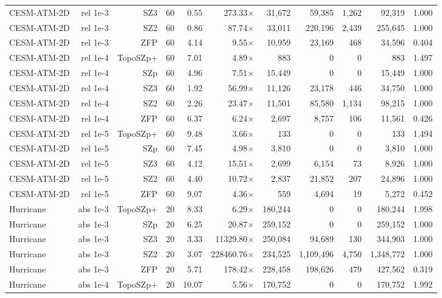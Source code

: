 \begin{tabular}{lrrrrrrrrrr}
CESM-ATM-2D & rel 1e-3 & SZ3 & 60 & 0.55 & 273.33$\times$ & 31,672 & 59,385 & 1,262 & 92,319 & 1.000 \\
CESM-ATM-2D & rel 1e-3 & SZ2 & 60 & 0.86 & 87.74$\times$ & 33,011 & 220,196 & 2,439 & 255,645 & 1.000 \\
CESM-ATM-2D & rel 1e-3 & ZFP & 60 & 4.14 & 9.55$\times$ & 10,959 & 23,169 & 468 & 34,596 & 0.404 \\
CESM-ATM-2D & rel 1e-4 & TopoSZp+ & 60 & 7.01 & 4.89$\times$ & 883 & 0 & 0 & 883 & 1.497 \\
CESM-ATM-2D & rel 1e-4 & SZp & 60 & 4.96 & 7.51$\times$ & 15,449 & 0 & 0 & 15,449 & 1.000 \\
CESM-ATM-2D & rel 1e-4 & SZ3 & 60 & 1.92 & 56.99$\times$ & 11,126 & 23,178 & 446 & 34,750 & 1.000 \\
CESM-ATM-2D & rel 1e-4 & SZ2 & 60 & 2.26 & 23.47$\times$ & 11,501 & 85,580 & 1,134 & 98,215 & 1.000 \\
CESM-ATM-2D & rel 1e-4 & ZFP & 60 & 6.37 & 6.24$\times$ & 2,697 & 8,757 & 106 & 11,561 & 0.426 \\
CESM-ATM-2D & rel 1e-5 & TopoSZp+ & 60 & 9.48 & 3.66$\times$ & 133 & 0 & 0 & 133 & 1.494 \\
CESM-ATM-2D & rel 1e-5 & SZp & 60 & 7.45 & 4.98$\times$ & 3,810 & 0 & 0 & 3,810 & 1.000 \\
CESM-ATM-2D & rel 1e-5 & SZ3 & 60 & 4.12 & 15.51$\times$ & 2,699 & 6,154 & 73 & 8,926 & 1.000 \\
CESM-ATM-2D & rel 1e-5 & SZ2 & 60 & 4.40 & 10.72$\times$ & 2,837 & 21,852 & 207 & 24,896 & 1.000 \\
CESM-ATM-2D & rel 1e-5 & ZFP & 60 & 9.07 & 4.36$\times$ & 559 & 4,694 & 19 & 5,272 & 0.452 \\
Hurricane & abs 1e-3 & TopoSZp+ & 20 & 8.33 & 6.29$\times$ & 180,244 & 0 & 0 & 180,244 & 1.998 \\
Hurricane & abs 1e-3 & SZp & 20 & 6.25 & 20.87$\times$ & 259,152 & 0 & 0 & 259,152 & 1.000 \\
Hurricane & abs 1e-3 & SZ3 & 20 & 3.33 & 11329.80$\times$ & 250,084 & 94,689 & 130 & 344,903 & 1.000 \\
Hurricane & abs 1e-3 & SZ2 & 20 & 3.07 & 228460.76$\times$ & 234,525 & 1,109,496 & 4,750 & 1,348,772 & 1.000 \\
Hurricane & abs 1e-3 & ZFP & 20 & 5.71 & 178.42$\times$ & 228,458 & 198,626 & 479 & 427,562 & 0.319 \\
Hurricane & abs 1e-4 & TopoSZp+ & 20 & 10.07 & 5.56$\times$ & 170,752 & 0 & 0 & 170,752 & 1.992 \\

\end{tabular}
